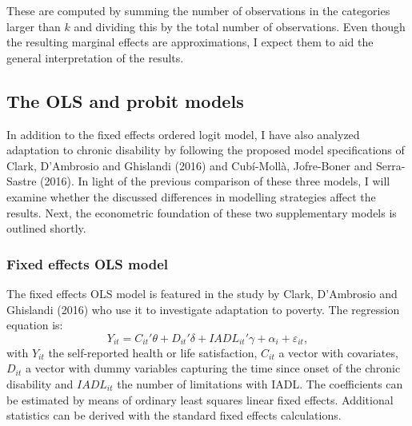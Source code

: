 \documentclass[12pt]{article}
\begin{document}
These are computed by summing the number of observations in the categories larger than $k$ and dividing this by the total number of observations. Even though the resulting marginal effects are approximations, I expect them to aid the general interpretation of the results. 


\subsection{The OLS and probit models}

In addition to the fixed effects ordered logit model, I have also analyzed adaptation to chronic disability by following the proposed model specifications of Clark, D'Ambrosio and Ghislandi (2016) and Cub\'i-Moll\`a, Jofre-Boner and Serra-Sastre (2016). In light of the previous comparison of these three models, I will examine whether the discussed differences in modelling strategies affect the results. Next, the econometric foundation of these two supplementary models is outlined shortly. 


\subsubsection{Fixed effects OLS model}

The fixed effects OLS model is featured in the study by Clark, D'Ambrosio and Ghislandi (2016) who use it to investigate adaptation to poverty. The regression equation is:
\begin{equation}
\label{FE}
    Y_{it} = C_{it}'\theta + D_{it}'\delta + IADL_{it}'\gamma + \alpha_{i} + \varepsilon_{it},
\end{equation}
with $Y_{it}$ the self-reported health or life satisfaction, $C_{it}$ a vector with covariates, $D_{it}$ a vector with dummy variables capturing the time since onset of the chronic disability and $IADL_{it}$ the number of limitations with IADL. The coefficients can be estimated by means of ordinary least squares linear fixed effects. Additional statistics can be derived with the standard fixed effects calculations. 

\end{document}
